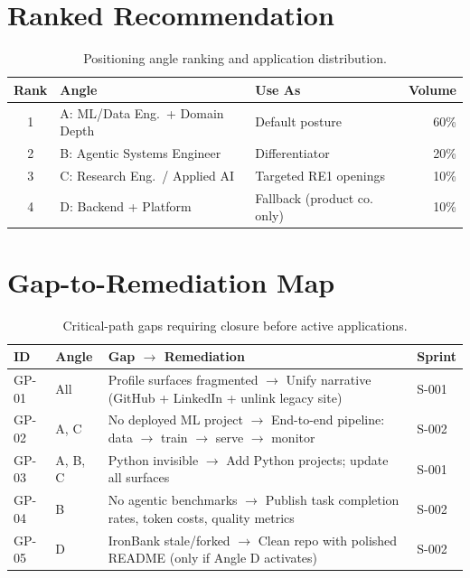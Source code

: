 \documentclass[a4paper,11pt,openany]{report}
\begin{document}
\section{Ranked Recommendation}

\begin{table}[htbp]
\centering
\caption{Positioning angle ranking and application distribution.}
\label{tab:ranking}
\begin{tabular}{c l l r}
\toprule
\textbf{Rank} & \textbf{Angle} & \textbf{Use As} & \textbf{Volume} \\
\midrule
1 & A: ML/Data Eng.\ + Domain Depth & Default posture       & 60\% \\
2 & B: Agentic Systems Engineer     & Differentiator        & 20\% \\
3 & C: Research Eng.\ / Applied AI  & Targeted RE1 openings & 10\% \\
4 & D: Backend + Platform           & Fallback (product co. only) & 10\% \\
\bottomrule
\end{tabular}
\end{table}

\section{Gap-to-Remediation Map}

\begin{table}[htbp]
\centering
\caption{Critical-path gaps requiring closure before active applications.}
\label{tab:gaps}
\small
\begin{tabularx}{\textwidth}{l l X l}
\toprule
\textbf{ID} & \textbf{Angle} & \textbf{Gap $\to$ Remediation} & \textbf{Sprint} \\
\midrule
GP-01 & All & Profile surfaces fragmented $\to$ Unify narrative (GitHub + LinkedIn + unlink legacy site) & S-001 \\
GP-02 & A, C & No deployed ML project $\to$ End-to-end pipeline: data $\to$ train $\to$ serve $\to$ monitor & S-002 \\
GP-03 & A, B, C & Python invisible $\to$ Add Python projects; update all surfaces & S-001 \\
GP-04 & B & No agentic benchmarks $\to$ Publish task completion rates, token costs, quality metrics & S-002 \\
GP-05 & D & IronBank stale/forked $\to$ Clean repo with polished README (only if Angle D activates) & S-002 \\
\bottomrule
\end{tabularx}
\end{table}
\end{document}
